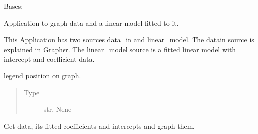 \documentclass[letterpaper,10pt,english]{sphinxmanual}
\begin{document}
\begin{fulllineitems}
\label{\detokenize{dalio.application:dalio.application.graphers.LMGrapher}}
Bases: {\hyperref[\detokenize{dalio.application:dalio.application.graphers.Grapher}]{}}

Application to graph data and a linear model fitted to it.

This Application has two sources data\_in and linear\_model. The data\sphinxhyphen{}in
source is explained in Grapher. The linear\_model source is a fitted
linear model with intercept and coefficient data.

\begin{fulllineitems}
\label{\detokenize{dalio.application:dalio.application.graphers.LMGrapher._legend}}
legend position on graph.
\begin{quote}\begin{description}
\item[{Type}] \leavevmode
str, None

\end{description}\end{quote}

\end{fulllineitems}


\begin{fulllineitems}
\label{\detokenize{dalio.application:dalio.application.graphers.LMGrapher.run}}
Get data, its fitted coefficients and intercepts and graph them.

\end{fulllineitems}


\end{fulllineitems}

\end{document}

